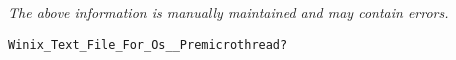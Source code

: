 \label{pkg:file\_\_premicrothread}

{\tiny \it The above information is manually maintained and may contain errors.}
\begin{verbatim}
Winix_Text_File_For_Os__Premicrothread?
\end{verbatim}
